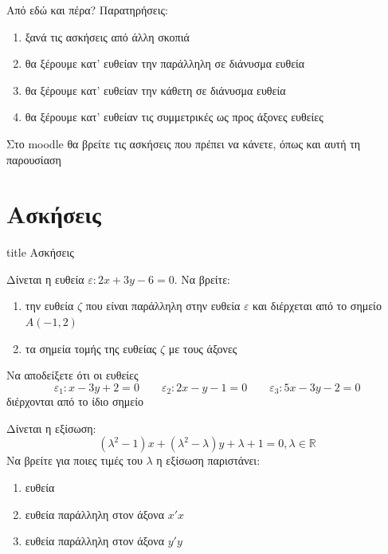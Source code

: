 \documentclass{../../presentation}
\begin{document}
\begin{frame}{Από εδώ και πέρα?}
  Παρατηρήσεις:
  \begin{enumerate}
    \item<1-> ξανά τις ασκήσεις από άλλη σκοπιά
    \item<2-> θα ξέρουμε κατ' ευθείαν την παράλληλη σε διάνυσμα ευθεία
    \item<3-> θα ξέρουμε κατ' ευθείαν την κάθετη σε διάνυσμα ευθεία
    \item<4-> θα ξέρουμε κατ' ευθείαν τις συμμετρικές ως προς άξονες ευθείες
  \end{enumerate}
\end{frame}

\begin{frame}[noframenumbering]
  Στο moodle θα βρείτε τις ασκήσεις που πρέπει να κάνετε, όπως και αυτή τη παρουσίαση
\end{frame}

\section{Ασκήσεις}

\begin{frame}[noframenumbering]
  \vfill
  \centering
  \begin{beamercolorbox}[sep=8pt,center,shadow=true,rounded=true]{title}
    Ασκήσεις
  \end{beamercolorbox}
  \vfill
\end{frame}

\begin{askisi} Δίνεται η ευθεία $ε:2x+3y-6=0$. Να βρείτε:
  \begin{enumerate}
    \item<1-> την ευθεία $ζ$ που είναι παράλληλη στην ευθεία $ε$ και διέρχεται από το σημείο $Α(-1,2)$
    \item<2-> τα σημεία τομής της ευθείας $ζ$ με τους άξονες
  \end{enumerate}

\end{askisi}

\begin{askisi} Να αποδείξετε ότι οι ευθείες
  $$ε_1:x-3y+2=0 \qquad ε_2:2x-y-1=0 \qquad ε_3:5x-3y-2=0$$
  διέρχονται από το ίδιο σημείο

\end{askisi}

\begin{askisi} Δίνεται η εξίσωση:
  $$(λ^2-1)x+(λ^2-λ)y+λ+1=0,λ\in\mathbb{R}$$
  Να βρείτε για ποιες τιμές του $λ$ η εξίσωση παριστάνει:
  \begin{enumerate}
    \item<1-> ευθεία
    \item<2-> ευθεία παράλληλη στον άξονα $x'x$
    \item<3-> ευθεία παράλληλη στον άξονα $y'y$
  \end{enumerate}

\end{askisi}
\end{document}
